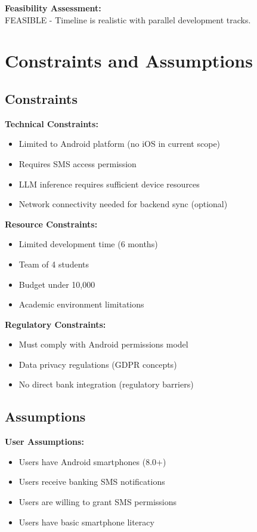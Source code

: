 \documentclass[11pt,a4paper]{report}
\begin{document}
\textbf{Feasibility Assessment:}\\
FEASIBLE - Timeline is realistic with parallel development tracks.

\section{Constraints and Assumptions}

\subsection{Constraints}

\textbf{Technical Constraints:}
\begin{itemize}
    \item Limited to Android platform (no iOS in current scope)
    \item Requires SMS access permission
    \item LLM inference requires sufficient device resources
    \item Network connectivity needed for backend sync (optional)
\end{itemize}

\textbf{Resource Constraints:}
\begin{itemize}
    \item Limited development time (6 months)
    \item Team of 4 students
    \item Budget under 10,000
    \item Academic environment limitations
\end{itemize}

\textbf{Regulatory Constraints:}
\begin{itemize}
    \item Must comply with Android permissions model
    \item Data privacy regulations (GDPR concepts)
    \item No direct bank integration (regulatory barriers)
\end{itemize}

\subsection{Assumptions}

\textbf{User Assumptions:}
\begin{itemize}
    \item Users have Android smartphones (8.0+)
    \item Users receive banking SMS notifications
    \item Users are willing to grant SMS permissions
    \item Users have basic smartphone literacy
\end{itemize}
\end{document}
